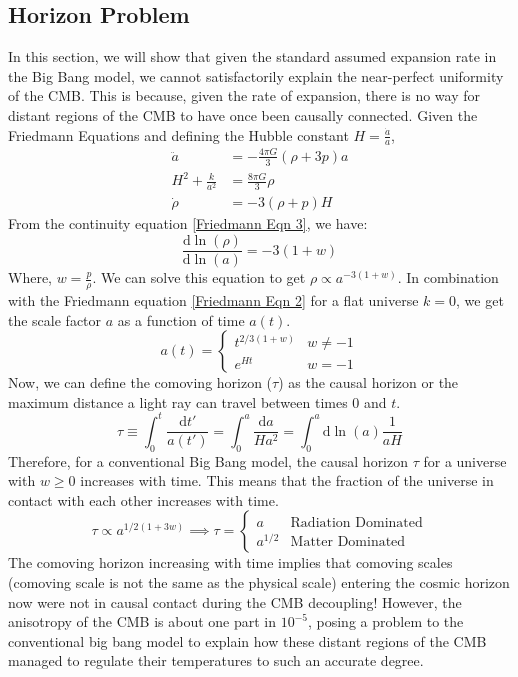 \documentclass[aps,prd,reprint,preprintnumbers,showpacs,floatfix,nofootinbib,superscript address]{revtex4-2}
\begin{document}
\subsection{Horizon Problem} \label{Horizon Problem}
In this section, we will show that given the standard assumed expansion rate in the Big Bang model, we cannot satisfactorily explain the near-perfect uniformity of the CMB. This is because, given the rate of expansion, there is no way for distant regions of the CMB to have once been causally connected.
Given the Friedmann Equations and defining the Hubble constant $H = \frac{\dot{a}}{a}$,
\begin{align}    
    \ddot{a} &= -\frac{4\pi G}{3} (\rho + 3p)a \label{Friedmann Eqn 1} \\
    H^2 + \frac{k}{a^2} &= \frac{8 \pi G}{3} \rho \label{Friedmann Eqn 2} \\
    \dot{\rho} &= -3(\rho + p)H \label{Friedmann Eqn 3}
\end{align}
From the continuity equation \cref{Friedmann Eqn 3}, we have:
\begin{equation} \label{4}
    \frac{\mathrm{d}  \ln(\rho)}{\mathrm{d} \ln(a)} = -3(1+w)
\end{equation}
Where, $w = \frac{p}{\rho}$. We can solve this equation to get $\rho \propto a^{-3(1+w)}$. In combination with the Friedmann equation \cref{Friedmann Eqn 2} for a flat universe $k = 0$, we get the scale factor $a$ as a function of time $a(t)$.
\begin{equation}    \label{5}
    a(t) = \begin{cases}
        t^{2/3(1+w)} & w \neq -1 \\
        e^{Ht} & w = -1
    \end{cases}
\end{equation}
Now, we can define the comoving horizon ($\tau$) as the causal horizon or the maximum distance a light ray can travel between times 0 and $t$.
\begin{equation}    \label{6}
    \tau \equiv \int_{0}^{t} \frac{\mathrm{d} t'}{a(t')} = \int_{0}^{a} \frac{\mathrm{d}a}{H a^2} = \int_{0}^{a} \mathrm{d} \ln(a) \frac{1}{aH}
\end{equation}
Therefore, for a conventional Big Bang model, the causal horizon $\tau$ for a universe with $w \geq 0$ increases with time. This means that the fraction of the universe in contact with each other increases with time.
\begin{equation}
    \tau \propto a^{1/2(1+3w)} \implies \tau = \begin{cases}
        a & \text{Radiation Dominated} \\
        a^{1/2} & \text{Matter Dominated}
    \end{cases}
\end{equation}
The comoving horizon increasing with time implies that comoving scales (comoving scale is not the same as the physical scale) entering the cosmic horizon now were not in causal contact during the CMB decoupling! However, the anisotropy of the CMB is about one part in $10^{-5}$, posing a problem to the conventional big bang model to explain how these distant regions of the CMB managed to regulate their temperatures to such an accurate degree.
\end{document}
